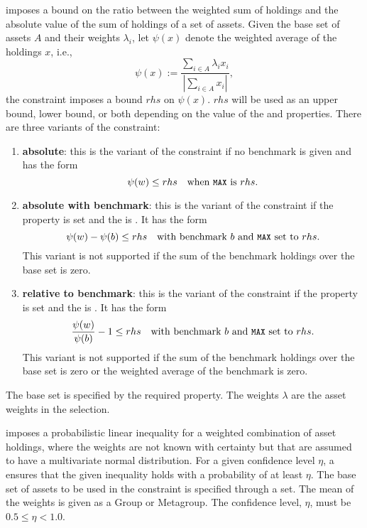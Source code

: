    imposes a bound on the ratio between the weighted sum of holdings and the absolute value of the sum of holdings of a set of assets. 
   Given the base set of assets $A$ and their weights $\lambda_i$, 
   let $\psi(x)$ denote the weighted average of the holdings $x$, i.e., 
   \[
       \psi(x) := \frac{\sum_{i\in A} \lambda_i x_i}{\left|\sum_{i\in A}x_i\right|},
   \]
   the constraint imposes a bound $rhs$ on $\psi(x)$. 
   $rhs$ will be used as an upper bound, lower bound, or both depending on the value of the  and  properties. 
   There are three variants of the constraint:
   \begin{enumerate}
     \item \textbf{absolute}: this is the variant of the constraint if no benchmark is given and has the form 
           \[
              \psi(w) \le rhs  \quad \text{when \mcode{MAX} is } rhs.
           \]
     \item \textbf{absolute with benchmark}: this is the variant of the constraint if the 
           property is set and the  is . 
           It has the form 
           \[
              \psi(w)-\psi(b) \le rhs  \quad \text{with benchmark $b$ and \mcode{MAX} set to } rhs.
           \]
           This variant is not supported if the sum of the benchmark holdings over the base set is zero.
     \item \textbf{relative to benchmark}: this is the variant of the constraint if the  property is set 
           and the  is . It has the form 
           \[
               \frac{\psi(w)}{\psi(b)} - 1 \le rhs \quad \text{with benchmark $b$ and \mcode{MAX} set to } rhs.
           \]
           This variant is not supported if the sum of the benchmark holdings over the base set is zero 
           or the weighted average of the benchmark is zero. 
   \end{enumerate}
   The base set is specified by the required  property. 
   The weights $\lambda$ are the asset weights in the selection. 

   imposes a probabilistic linear inequality for a weighted combination of asset holdings, 
   where the weights are not known with certainty but that are assumed to have a multivariate normal distribution. 
   For a given confidence level $\eta$, 
   a  ensures that the given inequality holds with a probability of at least $\eta$. 
   The base set of assets to be used in the constraint is specified through a  set. 
   The mean of the weights is given as a Group or Metagroup. 
   The confidence level, $\eta$, must be $0.5\le\eta<1.0$. 

